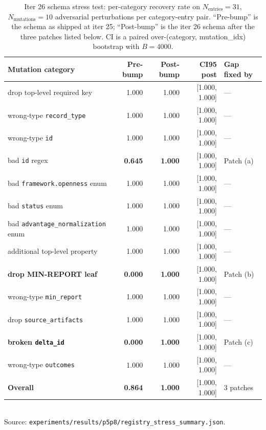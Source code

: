 \documentclass{article}
\begin{document}
\begin{table}[t]
\centering
\caption{Iter 26 schema stress test: per-category recovery rate on
$N_\text{entries}=31$, $N_\text{mutations}=10$ adversarial perturbations
per category-entry pair. ``Pre-bump'' is the schema as shipped at iter 25;
``Post-bump'' is the iter 26 schema after the three patches listed below. CI
is a paired over-(category, mutation\_idx) bootstrap with $B=4000$.}
\label{tab:p6-stress}
\small
\begin{tabular}{lrrrl}
\toprule
Mutation category & Pre-bump & Post-bump & CI95 post & Gap fixed by \\
\midrule
drop top-level required key  & 1.000 & 1.000 & [1.000, 1.000] & --- \\
wrong-type \texttt{record\_type} & 1.000 & 1.000 & [1.000, 1.000] & --- \\
wrong-type \texttt{id}       & 1.000 & 1.000 & [1.000, 1.000] & --- \\
bad \texttt{id} regex        & \textbf{0.645} & \textbf{1.000} & [1.000, 1.000] & Patch (a) \\
bad \texttt{framework.openness} enum & 1.000 & 1.000 & [1.000, 1.000] & --- \\
bad \texttt{status} enum     & 1.000 & 1.000 & [1.000, 1.000] & --- \\
bad \texttt{advantage\_normalization} enum & 1.000 & 1.000 & [1.000, 1.000] & --- \\
additional top-level property & 1.000 & 1.000 & [1.000, 1.000] & --- \\
\textbf{drop MIN-REPORT leaf}     & \textbf{0.000} & \textbf{1.000} & [1.000, 1.000] & Patch (b) \\
wrong-type \texttt{min\_report}  & 1.000 & 1.000 & [1.000, 1.000] & --- \\
drop \texttt{source\_artifacts} & 1.000 & 1.000 & [1.000, 1.000] & --- \\
\textbf{broken \texttt{delta\_id}}        & \textbf{0.000} & \textbf{1.000} & [1.000, 1.000] & Patch (c) \\
wrong-type \texttt{outcomes}   & 1.000 & 1.000 & [1.000, 1.000] & --- \\
\midrule
\textbf{Overall} & \textbf{0.864} & \textbf{1.000} & [1.000, 1.000] & 3 patches \\
\bottomrule
\end{tabular}\\
\footnotesize{Source:
\texttt{experiments/results/p5p8/registry\_stress\_summary.json}.}
\end{table}
\end{document}
